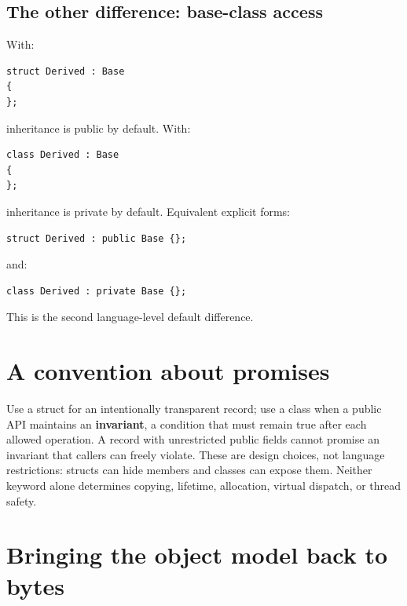 \subsection{The other difference: base-class access}\label{01-foundations-i-ch003-the-other-difference-base-class-access}

\hypertarget{01-foundations-i-ch003-the-other-difference-base-class-access}{}

With:

\begin{verbatim}
struct Derived : Base
{
};
\end{verbatim}

inheritance is public by default. With:

\begin{verbatim}
class Derived : Base
{
};
\end{verbatim}

inheritance is private by default. Equivalent explicit forms:

\begin{verbatim}
struct Derived : public Base {};
\end{verbatim}

and:

\begin{verbatim}
class Derived : private Base {};
\end{verbatim}

This is the second language-level default difference.

\section{A convention about promises}\label{01-foundations-i-ch003-a-convention-about-promises}

\hypertarget{01-foundations-i-ch003-a-convention-about-promises}{}

Use a struct for an intentionally transparent record; use a class when a public API maintains an \textbf{invariant}, a condition that must remain true after each allowed operation. A record with unrestricted public fields cannot promise an invariant that callers can freely violate. These are design choices, not language restrictions: structs can hide members and classes can expose them. Neither keyword alone determines copying, lifetime, allocation, virtual dispatch, or thread safety.

\section{Bringing the object model back to bytes}\label{01-foundations-i-ch003-bringing-the-object-model-back-to-bytes}

